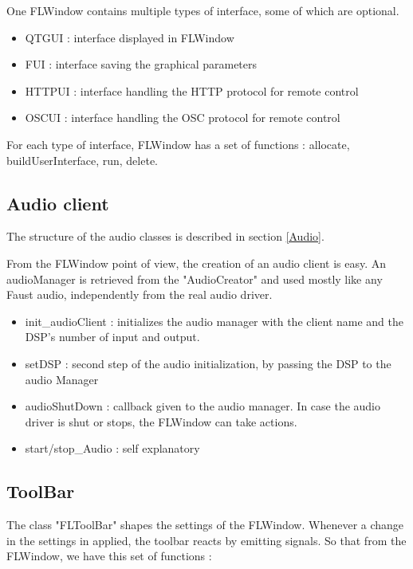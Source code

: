 \documentclass[a4paper]{article}
\begin{document}
One FLWindow contains multiple types of interface, some of which are optional. 

\begin{itemize}
\item QTGUI : interface displayed in FLWindow
\item FUI : interface saving the graphical parameters
\item HTTPUI : interface handling the HTTP protocol for remote control
\item OSCUI : interface handling the OSC protocol for remote control 
\end{itemize}

For each type of interface, FLWindow has a set of functions : allocate, buildUserInterface, run, delete.

\subsection{Audio client}

The structure of the audio classes is described in section \ref{Audio}.

From the FLWindow point of view, the creation of an audio client is easy. An audioManager is retrieved from the "AudioCreator" and used mostly like any Faust audio, independently from the real audio driver. 

\begin{itemize}
\item init\_audioClient : initializes the audio manager with the client name and the DSP's number of input and output.
\item setDSP : second step of the audio initialization, by passing the DSP to the audio Manager
\item audioShutDown : callback given to the audio manager. In case the audio driver is shut or stops, the FLWindow can take actions. 
\item start/stop\_Audio : self explanatory

\end{itemize}
\subsection{ToolBar}

The class "FLToolBar" shapes the settings of the FLWindow. Whenever a change in the settings in applied, the toolbar reacts by emitting signals. So that from the FLWindow, we have this set of functions :
\end{document}
